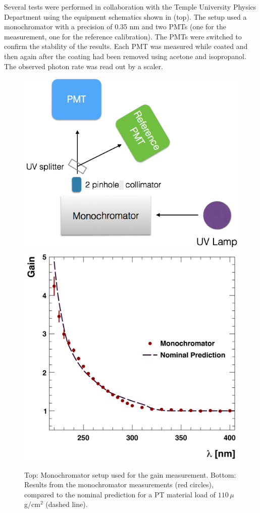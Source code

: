 Several tests were performed in collaboration with the Temple University Physics Department using the equipment schematics
shown in  (top). The setup used a monochromator with a precision of 0.35 nm and two PMTs
(one for the measurement, one for the   reference calibration). The PMTs were switched to confirm the stability of the results.
Each PMT was measured while coated and then again after the coating had been removed using acetone and isopropanol.
The observed photon rate was read out by a scaler.

\begin{figure}
	\centering
	\includegraphics[width=0.95\columnwidth, height=0.65\columnwidth]{img/pmtTestingSetup.png}
	\includegraphics[width=0.99\columnwidth, height=0.65\columnwidth]{img/ptQEResults.png}
	\caption{Top: Monochromator setup used for the gain measurement. Bottom: Results from the monochromator measurements (red circles), compared to the
				nominal prediction for a PT material load of $110\,\mu$ g/cm$^2$ (dashed line).}
	\label{fig:pmtTestingSetupAndptQEResults}
\end{figure}

